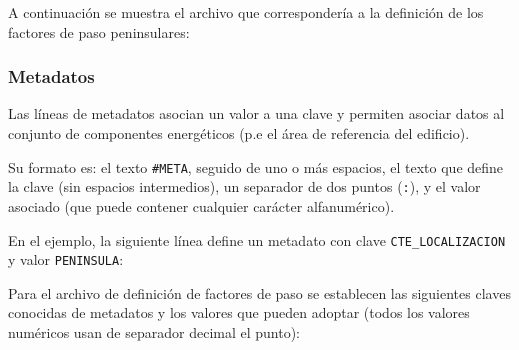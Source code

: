 \documentclass[10pt,notitlepage,oneside,a4paper]{article}
\begin{document}
A continuación se muestra el archivo que correspondería a la definición de los factores de paso peninsulares:



\subsubsection{Metadatos}

Las líneas de metadatos asocian un valor a una clave y permiten asociar datos al conjunto de componentes energéticos (p.e el área de referencia del edificio).

Su formato es: el texto \texttt{\#META}, seguido de uno o más espacios, el texto que define la clave (sin espacios intermedios), un separador de dos puntos (\texttt{:}), y el valor asociado (que puede contener cualquier carácter alfanumérico).

En el ejemplo, la siguiente línea define un metadato con clave \texttt{CTE\_LOCALIZACION} y valor \texttt{PENINSULA}:



Para el archivo de definición de factores de paso se establecen las siguientes claves conocidas de metadatos y los valores que pueden adoptar (todos los valores numéricos usan de separador decimal el punto):
\end{document}
